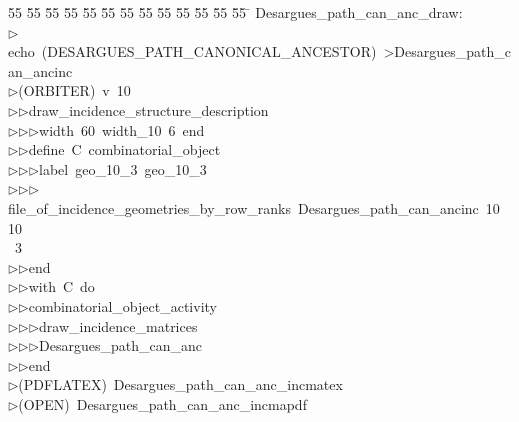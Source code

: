 %
%
\begin{tabbing}
55 \= 55 \= 55 \= 55 \= 55 \= 55 \= 55 \= 55 \= 55 \= 55 \= 55 \= 55 \= 55 \= \kill
Desargues\_path\_can\_anc\_draw:\\[0pt]
$\triangleright$\>echo\ (DESARGUES\_PATH\_CANONICAL\_ANCESTOR)\ {\textgreater}Desargues\_path\_can\_ancinc\\[0pt]
$\triangleright$\>(ORBITER)\ v\ 10\ \\[0pt]
$\triangleright$\>$\triangleright$\>draw\_incidence\_structure\_description\ \\[0pt]
$\triangleright$\>$\triangleright$\>$\triangleright$\>width\ 60\ width\_10\ 6\ end\ \\[0pt]
$\triangleright$\>$\triangleright$\>define\ C\ combinatorial\_object\ \\[0pt]
$\triangleright$\>$\triangleright$\>$\triangleright$\>label\ geo\_10\_3\ geo\_10\_3\ \\[0pt]
$\triangleright$\>$\triangleright$\>$\triangleright$\>file\_of\_incidence\_geometries\_by\_row\_ranks\ Desargues\_path\_can\_ancinc\ 10\ 10\\[0pt]
\ 3\ \\[0pt]
$\triangleright$\>$\triangleright$\>end\ \\[0pt]
$\triangleright$\>$\triangleright$\>with\ C\ do\ \\[0pt]
$\triangleright$\>$\triangleright$\>combinatorial\_object\_activity\ \\[0pt]
$\triangleright$\>$\triangleright$\>$\triangleright$\>draw\_incidence\_matrices\ \\[0pt]
$\triangleright$\>$\triangleright$\>$\triangleright$\>Desargues\_path\_can\_anc\ \\[0pt]
$\triangleright$\>$\triangleright$\>end\\[0pt]
$\triangleright$\>(PDFLATEX)\ Desargues\_path\_can\_anc\_incmatex\\[0pt]
$\triangleright$\>(OPEN)\ Desargues\_path\_can\_anc\_incmapdf\\[0pt]
\end{tabbing}
